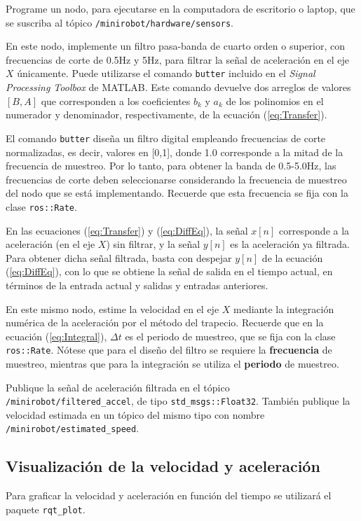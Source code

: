 \documentclass[letterpaper,12pt]{article}
\begin{document}
Programe un nodo, para ejecutarse en la computadora de escritorio o laptop, que se suscriba al tópico \texttt{/minirobot/hardware/sensors}. 

En este nodo, implemente un filtro pasa-banda de cuarto orden o superior, con frecuencias de corte de 0.5Hz y 5Hz, para filtrar la señal de aceleración en el eje $X$ únicamente. Puede utilizarse el comando \texttt{butter} incluido en el \textit{Signal Processing Toolbox} de MATLAB. Este comando devuelve dos arreglos de valores $[B,A]$ que corresponden a los coeficientes $b_k$ y $a_k$ de los polinomios en el numerador y denominador, respectivamente, de la ecuación (\ref{eq:Transfer}). 

El comando \texttt{butter} diseña un filtro digital empleando frecuencias de corte normalizadas, es decir, valores en [0,1], donde 1.0 corresponde a la mitad de la frecuencia de muestreo. Por lo tanto, para obtener la banda de 0.5-5.0Hz, las frecuencias de corte deben seleccionarse considerando la frecuencia de muestreo del nodo que se está implementando. Recuerde que esta frecuencia se fija con la clase \texttt{ros::Rate}.

En las ecuaciones (\ref{eq:Transfer}) y (\ref{eq:DiffEq}), la señal $x[n]$ corresponde a la aceleración (en el eje $X$) sin filtrar, y la señal $y[n]$ es la aceleración ya filtrada. Para obtener dicha señal filtrada, basta con despejar $y[n]$ de la ecuación (\ref{eq:DiffEq}), con lo que se obtiene la señal de salida en el tiempo actual, en términos de la entrada actual y salidas y entradas anteriores. 

En este mismo nodo, estime la velocidad en el eje $X$ mediante la integración numérica de la aceleración por el método del trapecio. Recuerde que en la ecuación (\ref{eq:Integral}), $\Delta t$ es el periodo de muestreo, que se fija con la clase \texttt{ros::Rate}. Nótese que para el diseño del filtro se requiere la \textbf{frecuencia} de muestreo, mientras que para la integración se utiliza el \textbf{periodo} de muestreo. 

Publique la señal de aceleración filtrada en el tópico \texttt{/minirobot/filtered\_accel}, de tipo \texttt{std\_msgs::Float32}. También publique la velocidad estimada en un tópico del mismo tipo con nombre \texttt{/minirobot/estimated\_speed}.

\subsection{Visualización de la velocidad y aceleración}
Para graficar la velocidad y aceleración en función del tiempo se utilizará el paquete \texttt{rqt\_plot}.
\end{document}
